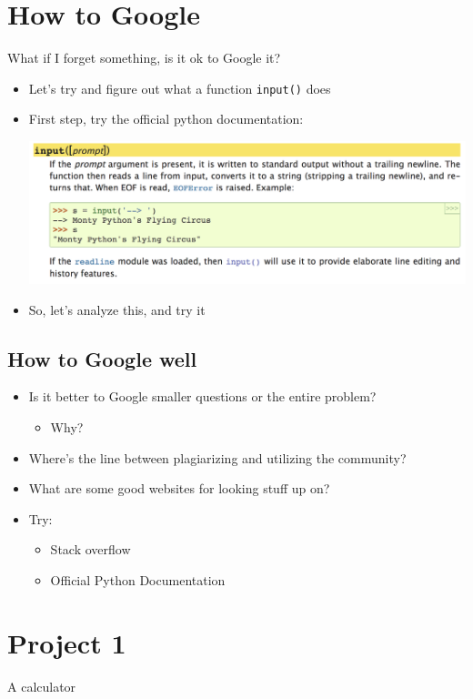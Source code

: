 \documentclass[11pt]{article}
\begin{document}
\section{How to Google}
\label{sec:org5cc5df9}
What if I forget something, is it ok to Google it?

\begin{itemize}
\item Let's try and figure out what a function \texttt{input()} does
\item First step, try the official python documentation:
\begin{center}
\includegraphics[width=.9\linewidth]{./python_docs.png}
\end{center}
\item So, let's analyze this, and try it
\end{itemize}
\subsection{How to Google well}
\label{sec:org114625d}
\begin{itemize}
\item Is it better to Google smaller questions or the entire problem?
\begin{itemize}
\item Why?
\end{itemize}
\item Where's the line between plagiarizing and utilizing the community?
\item What are some good websites for looking stuff up on?
\item Try:
\begin{itemize}
\item Stack overflow
\item Official Python Documentation
\end{itemize}
\end{itemize}
\section{Project 1}
\label{sec:org5eabebb}
A calculator
\end{document}
